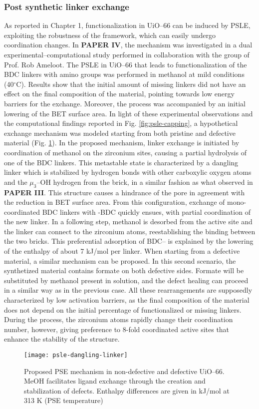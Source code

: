 \subsubsection{Post synthetic linker exchange}
As reported in Chapter 1, functionalization in UiO--66 can be induced by PSLE, exploiting the robustness of the framework, which can easily undergo coordination changes. In \textbf{PAPER IV}, the mechanism was investigated in a dual experimental--computational study performed in collaboration with the group of Prof. Rob Ameloot. The PSLE in UiO--66 that leads to functionalization of the BDC linkers with amino groups was performed in methanol at mild conditions (40$^\circ$C). Results show that the initial amount of missing linkers did not have an effect on the final composition of the material, pointing towards low energy barriers for the exchange. Moreover, the process was accompanied by an initial lowering of the BET surface area. In light of these experimental observations and the computational findings reported in Fig. \ref{fig:psle-capping}, a hypothetical exchange mechanism was modeled starting from both pristine and defective material (Fig. \ref{fig:psle-dangling-linker}). In the proposed mechanism, linker exchange is initiated by coordination of methanol on the zirconium sites, causing a partial hydrolysis of one of the BDC linkers. This metastable state is characterized by a dangling linker which is stabilized by hydrogen bonds with other carboxylic oxygen atoms and the $\mu_3$--OH hydrogen from the brick, in a similar fashion as what observed in \textbf{PAPER III}. This structure causes a hindrance of the pore in agreement with the reduction in BET surface area. From this configuration, exchange of mono-coordinated BDC linkers with -BDC quickly ensues, with partial coordination of the new linker. In a following step, methanol is desorbed from the active site and the linker can connect to the zirconium atoms, reestablishing the binding between the two bricks. This preferential adsorption of BDC-- is explained by the lowering of the enthalpy of about 7 kJ/mol per linker. When starting from a defective material, a similar mechanism can be proposed. In this second scenario, the synthetized material contains formate on both defective sides. Formate will be substituted by methanol present in solution, and the defect healing can proceed in a similar way as in the previous case. All these rearrangements are supposedly characterized by low activation barriers, as the final composition of the material does not depend on the initial percentage of functionalized or missing linkers. During the process, the zirconium atoms rapidly change their coordination number, however, giving preference to 8-fold coordinated active sites that enhance the stability of the structure. 
\begin{figure}[!htbp]
	\centering
	\texttt{[image: psle-dangling-linker]}
	\caption{Proposed PSE mechanism in non-defective and defective UiO--66. MeOH facilitates ligand exchange through the creation and stabilization of defects. Enthalpy differences are given in kJ/mol at 313 K (PSE temperature)}
	\label{fig:psle-dangling-linker}
\end{figure}

